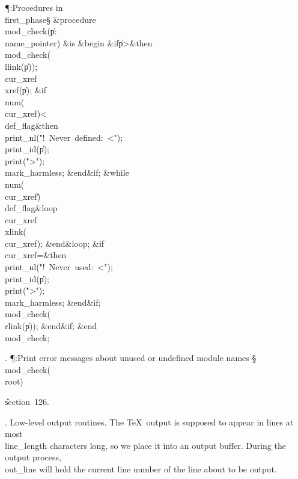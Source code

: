 \Y\P\?\4:Procedures in \\{first\_phase}\X\mathrel{+}\S\?\6
\&{procedure}\8\1\\{mod\_check}\?(\1\?\|p\?:\?\\{name\_pointer}\?\2)\?\2\8%
\&{is}\8\1\6
\4\&{begin}\6
\&{if}\1\1\8\|p\?>\2\8\&{then}\6
\\{mod\_check}\?\1(\?\\{llink}\?\1(\?\|p\?\2)\2)\?;\6
\\{cur\_xref}\?\K\?\\{xref}\?\1(\?\|p\?\2)\?;\6
\&{if}\1\1\8\\{num}\?\1(\?\\{cur\_xref}\?\2)<\?\\{def\_flag}\2\8\&{then}\6
\\{print\_nl}\?\1(\?\.{"!\ Never\ defined:\ <"}\?\2)\?;\5
\\{print\_id}\?\1(\?\|p\?\2)\?;\5
\\{print}\?\1(\?\.{">"}\?\2)\?;\5
\\{mark\_harmless};\2\6
\&{end}\8\2\&{if}\1;\6
\1\&{while}\8\\{num}\?\1(\?\\{cur\_xref}\?\2)\G\?\\{def\_flag}\8\&{loop}\6
\\{cur\_xref}\?\K\?\\{xlink}\?\1(\?\\{cur\_xref}\?\2)\?;\2\6
\&{end}\8\&{loop};\6
\&{if}\1\1\8\\{cur\_xref}\?=\2\8\&{then}\6
\\{print\_nl}\?\1(\?\.{"!\ Never\ used:\ <"}\?\2)\?;\5
\\{print\_id}\?\1(\?\|p\?\2)\?;\5
\\{print}\?\1(\?\.{">"}\?\2)\?;\5
\\{mark\_harmless};\2\6
\&{end}\8\2\&{if}\1;\6
\\{mod\_check}\?\1(\?\\{rlink}\?\1(\?\|p\?\2)\2)\?;\2\6
\&{end}\8\2\&{if}\1;\2\6
\&{end}\8\\{mod\_check};\par
\fi

. \P\?:Print error messages about unused or undefined module names\X%
\S\?\8\\{mod\_check}\?\1(\?\\{root}\?\2)\?\par
\U section~126.\fi

.  Low-level output routines.
The \TeX\ output is supposed to appear in lines at most \\{line\_length}
characters long, so we place it into an output buffer. During the output
process, \\{out\_line} will hold the current line number of the line about to
be output.

